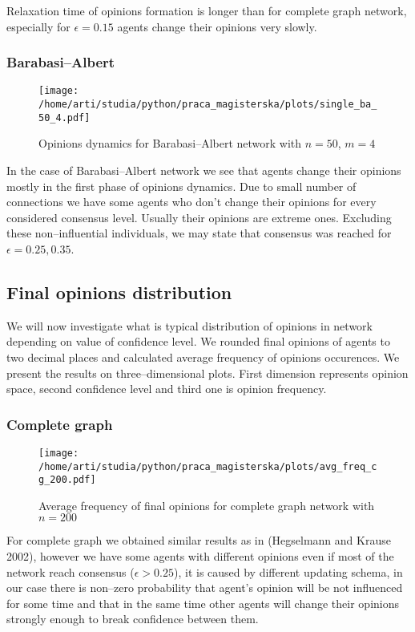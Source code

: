 \documentclass{article}
\begin{document}
Relaxation time of opinions formation is longer than for complete graph network, especially for $\epsilon=0.15$ agents change their opinions very slowly.

\subsubsection{Barabasi--Albert}

\begin{figure}[H]
		\centering
		\texttt{[image: /home/arti/studia/python/praca\_magisterska/plots/single\_ba\_50\_4.pdf]}
		\caption{Opinions dynamics for Barabasi--Albert network with $n=50$, $m=4$}
\end{figure}
In the case of Barabasi--Albert network we see that agents change their opinions mostly in the first phase of opinions dynamics. Due to small number of connections we have some agents who don't change their opinions for every considered consensus level. Usually their opinions are extreme ones. Excluding these non--influential individuals, we may state that consensus was reached for $\epsilon=0.25, 0.35$.

\subsection{Final opinions distribution}

We will now investigate what is typical distribution of opinions in network depending on value of confidence level. We rounded final opinions of agents to two decimal places and calculated average frequency of opinions occurences. We present the results on three--dimensional plots. First dimension represents opinion space, second confidence level and third one is opinion frequency.

\subsubsection{Complete graph}

\begin{figure}[H]
		\centering
		\texttt{[image: /home/arti/studia/python/praca\_magisterska/plots/avg\_freq\_cg\_200.pdf]}
		\caption{Average frequency of final opinions for complete graph network with $n=200$}
\end{figure}

For complete graph we obtained similar results as in (Hegselmann and Krause 2002), however we have some agents with different opinions even if most of the network reach consensus ($\epsilon > 0.25$), it is caused by different updating schema, in our case there is non--zero probability that agent's opinion will be not influenced for some time and that in the same time other agents will change their opinions strongly enough to break confidence between them.
\indent
\end{document}

